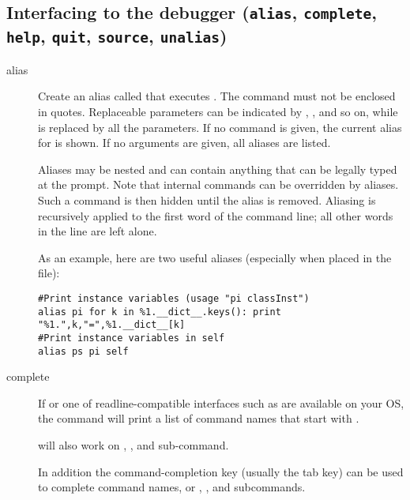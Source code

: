 \subsection{Interfacing to the debugger ({\tt alias}, {\tt complete}, 
{\tt help}, {\tt quit}, {\tt source}, {\tt unalias})\label{subsection-misc}}

\begin{description}

\item[alias ]\label{command:aliases}

Create an alias called  that executes .  The
command must not be enclosed in quotes.  Replaceable parameters
can be indicated by , , and so on, while \samp{\%*} is
replaced by all the parameters.  If no command is given, the current
alias for  is shown. If no arguments are given, all
aliases are listed.

Aliases may be nested and can contain anything that can be legally
typed at the  prompt.  Note that internal 
commands can be overridden by aliases.  Such a command is then hidden
until the alias is removed.  Aliasing is recursively applied to the
first word of the command line; all other words in the line are left
alone.

As an example, here are two useful aliases (especially when placed
in the  file):

\begin{verbatim}
#Print instance variables (usage "pi classInst")
alias pi for k in %1.__dict__.keys(): print "%1.",k,"=",%1.__dict__[k]
#Print instance variables in self
alias ps pi self
\end{verbatim}
                
\item[complete ]\label{command:complete}

If
or one of readline-compatible interfaces such as
are available on your OS, the  command will print a
list of command names that start with .

 will also work on , , and
 sub-command. 

In addition the command-completion key (usually the tab key) can be
used to complete command names, or , , and
 subcommands.


\end{description}

